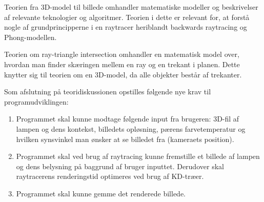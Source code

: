 Teorien fra 3D-model til billede omhandler matematiske modeller og beskrivelser af relevante teknologier og algoritmer. Teorien i dette er relevant for, at forstå nogle af grundprincipperne i en raytracer heriblandt backwards raytracing og Phong-modellen.

Teorien om ray-triangle intersection omhandler en matematisk model over, hvordan man finder skæringen mellem en ray og en trekant i planen. Dette knytter sig til teorien om en 3D-model, da alle objekter består af trekanter. 

Som afslutning på teoridiskussionen opstilles følgende nye krav til programudviklingen:
\begin{enumerate}
    \item Programmet skal kunne modtage følgende input fra brugeren: 3D-fil af lampen og dens kontekst, billedets opløsning, pærens farvetemperatur og hvilken synsvinkel man ønsker at se billedet fra (kameraets position).
    \item Programmet skal ved brug af raytracing kunne fremstille et billede af lampen og dens belysning på baggrund af bruger inputtet. Derudover skal raytracerens renderingstid optimeres ved brug af KD-træer.
    \item Programmet skal kunne gemme det renderede billede.
\end{enumerate}